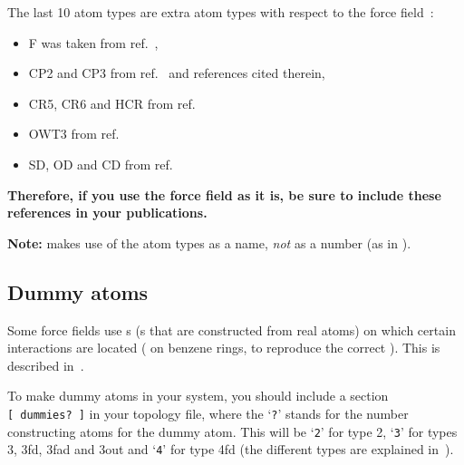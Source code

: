 The last 10 atom types are extra atom types with respect to the 
force field~\cite{biomos}: 
\begin{itemize}
\item F was taken from ref.~\cite{Buuren93a}, 
\item CP2 and CP3 from ref.~\cite{Buuren93b} and references cited therein, 
\item CR5, CR6 and HCR from ref.~\cite{Spoel96c}
\item OWT3 from ref.~\cite{Jorgensen83}
\item SD, OD and CD from ref.~\cite{Liu95}
\end{itemize}
{\bf Therefore, if you use the {\gromacs} force field as it is, be
sure to include these references in your publications.}

{\bf Note:} {\gromacs} makes use of the atom types as a name, {\em
not} as a number (as {\eg} in {\gromos}).

%
%

\subsection{Dummy atoms}
\label{sec:dummytop}
Some force fields use s 
(s that are constructed
from real atoms) on which certain interactions are located
({\eg} on benzene rings, to reproduce the correct
). This is described in~.

To make dummy atoms in your system, you should include a section
{\tt [~dummies?~]} in your topology file, where the `{\tt ?}' stands
for the number constructing atoms for the dummy atom. This will be
`{\tt 2}' for type 2, `{\tt 3}' for types 3, 3fd, 3fad and 3out and
`{\tt 4}' for type 4fd (the different types are explained
in~).

